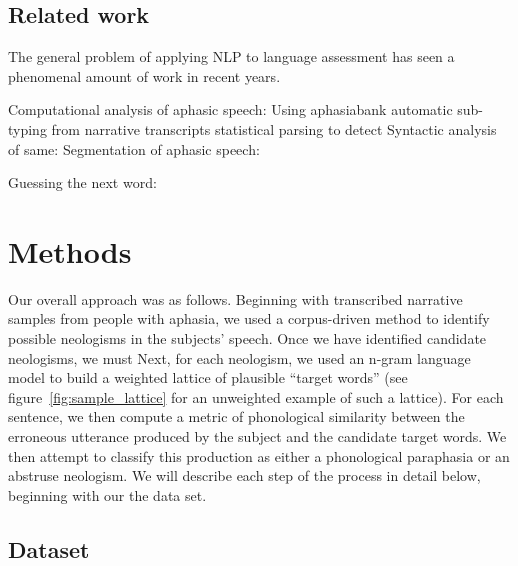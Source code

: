 \subsection{Related work} %
\label{sub:related_work}

The general problem of applying NLP to language assessment has seen a phenomenal amount of work in recent years.

Computational analysis of aphasic speech:
    Using aphasiabank \cite{MacWhinney:2011er}
    automatic sub-typing from narrative transcripts\cite{Fraser:2014bg}
    statistical parsing to detect\cite{fraser-EtAl:2014:W14-34}
        Syntactic analysis of same: \cite{Goodglass:1994dp}
Segmentation of aphasic speech: \cite{fraser-EtAl:2015:NAACL-HLT}

Guessing the next word: \cite{Shannon:1951p5641}


\section{Methods}

Our overall approach was as follows.
Beginning with transcribed narrative samples from people with aphasia, we used a corpus-driven method to identify possible neologisms in the subjects' speech.
Once we have identified candidate neologisms, we must
Next, for each neologism, we used an n-gram language model to build a weighted lattice of plausible ``target words'' (see figure~\ref{fig:sample_lattice} for an unweighted example of such a lattice).
For each sentence, we then compute a metric of phonological similarity between the erroneous utterance produced by the subject and the candidate target words.
We then attempt to classify this production as either a phonological paraphasia or an abstruse neologism.
We will describe each step of the process in detail below, beginning with our the data set.

\subsection{Dataset} %
\label{sub:dataset}

